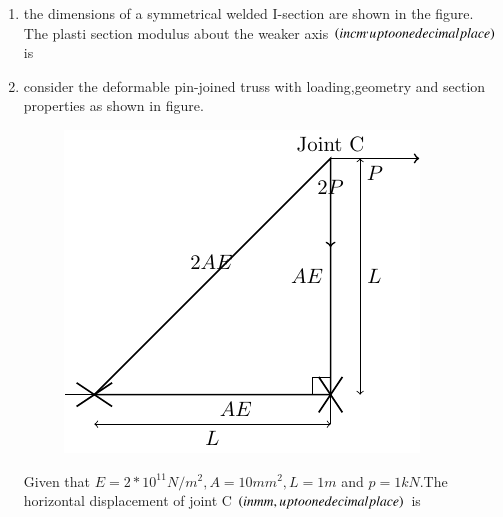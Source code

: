 \documentclass[journal,12pt,twocolumn]{IEEEtran}
\theoremstyle{remark}
\begin{document}
\begin{enumerate}
\begin{figure}[h!]
\end{figure}
 \item the dimensions of a symmetrical welded I-section are shown in the figure.\\
 
 The plasti section modulus about the weaker axis $\left(in cm^,up to one decimal place\right)$ is\\
 \item consider the deformable pin-joined truss with loading,geometry and section properties as shown in figure.\\

 \begin{figure}[h!]
         \centering
        \includegraphics[width=0.7\linewidth]{figure/fig2/fig2.pdf}
		\caption{}
        \label{stemplot}

\end{figure}





 Given that $E = 2 * 10^{11} N/m^{2},A=10 mm^{2},L=1 m$ and $p=1 kN$.The horizontal displacement of joint C $\left(in mm,up to one decimal place\right)$ is\\


\end{enumerate}
\end{document}
